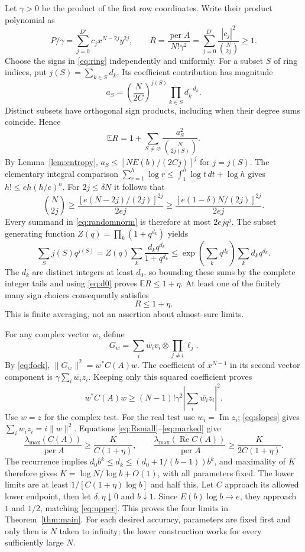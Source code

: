\documentclass[11pt]{article}
\DeclareMathOperator{\per}{per}
\DeclareMathOperator{\Ree}{Re}
\DeclareMathOperator{\Imm}{Im}
\begin{document}
Let $\gamma>0$ be the product of the first row coordinates. Write their product
polynomial as
\[
 P/\gamma=\sum_{j=0}^{D'}c_jx^{N-2j}y^{2j},\qquad
 R=\frac{\per A}{N!\gamma^2}
   =\sum_{j=0}^{D'}\frac{|c_j|^2}{\binom N{2j}}\ge1.
\]
Choose the signs in \eqref{eq:ring} independently and uniformly. For a subset
$S$ of ring indices, put $j(S)=\sum_{k\in S}d_k$. Its coefficient contribution
has magnitude
\[
 a_S=\left(\frac{N}{2C}\right)^{j(S)}
           \prod_{k\in S}d_k^{-d_k}.
\]
Distinct subsets have orthogonal sign products, including when their degree
sums coincide. Hence
\begin{equation}\label{eq:randomnorm}
 \mathbb ER=1+\sum_{S\ne\varnothing}
          \frac{a_S^2}{\binom N{2j(S)}}.
\end{equation}
By Lemma~\ref{lem:entropy}, $a_S\le[NE(b)/(2Cj)]^j$ for $j=j(S)$.
The elementary integral comparison
$\sum_{r=1}^h\log r\le\int_1^h\log t\,dt+\log h$ gives
$h!\le eh(h/e)^h$. For $2j\le\delta N$ it follows that
\[
 \binom N{2j}\ge\frac{[e(N-2j)/(2j)]^{2j}}{2ej}
 \ge\frac{[e(1-\delta)N/(2j)]^{2j}}{2ej}.
\]
Every summand in \eqref{eq:randomnorm} is therefore at most $2ejq^j$.
The subset generating function $Z(q)=\prod_k(1+q^{d_k})$ yields
\[
 \sum_Sj(S)q^{j(S)}
 =Z(q)\sum_k\frac{d_kq^{d_k}}{1+q^{d_k}}
 \le\exp\!\left(\sum_kq^{d_k}\right)\sum_kd_kq^{d_k}.
\]
The $d_k$ are distinct integers at least $d_0$, so bounding these sums by the
complete integer tails and using \eqref{eq:d0} proves $\mathbb ER\le1+\eta$.
At least one of the finitely many sign choices consequently satisfies
\begin{equation}\label{eq:Rsmall}
 R\le1+\eta.
\end{equation}
This is finite averaging, not an assertion about almost-sure limits.

For any complex vector $w$, define
\[
 G_w=\sum_i\overline{w_i}v_i\otimes\prod_{j\ne i}\ell_j.
\]
By \eqref{eq:fock}, $\|G_w\|^2=w^*C(A)w$. The coefficient of $x^{N-1}$ in
its second vector component is $\gamma\sum_i\overline{w_i}z_i$. Keeping only
this squared coefficient proves
\begin{equation}\label{eq:marked}
 w^*C(A)w\ge(N-1)!\gamma^2
                  \left|\sum_i\overline{w_i}z_i\right|^2.
\end{equation}
Use $w=z$ for the complex test. For the real test use $w_i=\Imm z_i$;
\eqref{eq:slopes} gives $\sum_iw_iz_i=i\|w\|^2$. Equations
\eqref{eq:Rsmall}--\eqref{eq:marked} give
\[
 \frac{\lambda_{\max}(C(A))}{\per A}\ge\frac{K}{C(1+\eta)},\qquad
 \frac{\lambda_{\max}(\Ree C(A))}{\per A}\ge\frac{K}{2C(1+\eta)}.
\]
The recurrence implies
$d_0b^k\le d_k\le(d_0+1/(b-1))b^k$, and maximality of $K$ therefore gives
$K=\log N/\log b+O(1)$, with all parameters fixed. The lower limits are at
least $1/[C(1+\eta)\log b]$ and half this. Let $C$ approach its allowed lower
endpoint, then let $\delta,\eta\downarrow0$ and $b\downarrow1$. Since
$E(b)\log b\to e$, they approach $1$ and $1/2$, matching \eqref{eq:upper}.
This proves the four limits in Theorem~\ref{thm:main}. For each desired accuracy,
parameters are fixed first and only then is $N$ taken to infinity; the lower
construction works for every sufficiently large $N$.
\end{document}
